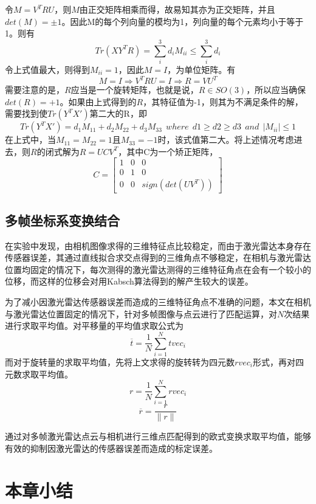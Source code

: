 令$M=V^TRU$，则$M$由正交矩阵相乘而得，故易知其亦为正交矩阵，并且$det(M)=\pm 1$。因此M的每个列向量的模均为1，列向量的每个元素均小于等于1。则有
\begin{equation}
    Tr(XY^TR)=\sum_i^3{d_i M_{ii}} \leq \sum_i^3{d_i}
\end{equation}
令上式值最大，则得到$M_{ii}=1$，因此$M=I$，为单位矩阵。有
\begin{equation}
    M=I\Rightarrow V^TRU=I \Rightarrow R=VU^T
\end{equation}
需要注意的是，$R$应当是一个旋转矩阵，也就是说，$R \in SO(3)$，所以应当确保 $det(R)=+1$。如果由上式得到的$R$，其特征值为-1，则其为不满足条件的解，需要找到使$Tr(Y^TX')$第二大的R，即
\begin{equation}
    Tr(Y^TX')=d_1M_{11}+d_2M_{22}+d_3M_{33}\ \ where\ \ d1\geq d2 \geq d3 \ \ and\ \ |M_{ii}| \leq 1
\end{equation}
在上式中，当$M_{11}=M_{22}=1$且$M_{33}=-1$时，该式值第二大。将上述情况考虑进去，则$R$的闭式解为$R=UCV^T$，其中C为一个矫正矩阵，
$$
C=\begin{bmatrix} 1&0&0 \\ 0&1&0 \\ 0&0&sign(det(UV^T))
\end{bmatrix}
$$

\subsection{多帧坐标系变换结合}
在实验中发现，由相机图像求得的三维特征点比较稳定，而由于激光雷达本身存在传感器误差，其通过直线拟合求交点得到的三维角点不够稳定，在相机与激光雷达位置均固定的情况下，每次测得的激光雷达测得的三维特征角点在会有一个较小的位移，而这样的位移会对用Kabsch算法得到的解产生较大的误差。

为了减小因激光雷达传感器误差而造成的三维特征角点不准确的问题，本文在相机与激光雷达位置固定的情况下，针对多帧图像与点云进行了匹配运算，对$N$次结果进行求取平均值。对平移量的平均值求取公式为
$$\overline{t}=\frac{1}{N}\sum_{i=1}^N{{tvec}_i}$$
而对于旋转量的求取平均值，先将上文求得的旋转转为四元数${rvec}_i$形式，再对四元数求取平均值。
$$r=\frac{1}{N}\sum_{i=1}^N{{rvec}_i}$$
$$\overline{r}=\frac{r}{\|r\|}$$

通过对多帧激光雷达点云与相机进行三维点匹配得到的欧式变换求取平均值，能够有效的抑制因激光雷达的传感器误差而造成的标定误差。

\section{本章小结}

